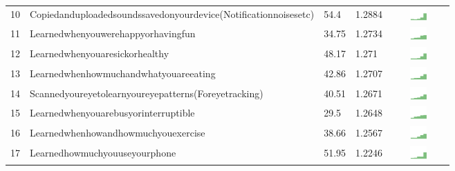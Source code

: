 \documentclass[a4paper,12pt]{article}
\begin{document}
\begin{longtable}{| p{0.5cm} | p{7cm} | p{1cm} |p{1cm} | c |}
10 & Copiedanduploadedsoundssavedonyourdevice(Notificationnoisesetc) & 54.4 & 1.2884&\includegraphics[width = 2cm, height = 0.5cm]{tables/copiedanduploadedsoundssavedonyourdevice(notificationnoisesetc)combined} \\ 
11 & Learnedwhenyouwerehappyorhavingfun & 34.75 & 1.2734&\includegraphics[width = 2cm, height = 0.5cm]{tables/learnedwhenyouwerehappyorhavingfuncombined} \\ 
12 & Learnedwhenyouaresickorhealthy & 48.17 & 1.271&\includegraphics[width = 2cm, height = 0.5cm]{tables/learnedwhenyouaresickorhealthycombined} \\ 
13 & Learnedwhenhowmuchandwhatyouareeating & 42.86 & 1.2707&\includegraphics[width = 2cm, height = 0.5cm]{tables/learnedwhenhowmuchandwhatyouareeatingcombined} \\ 
14 & Scannedyoureyetolearnyoureyepatterns(Foreyetracking) & 40.51 & 1.2671&\includegraphics[width = 2cm, height = 0.5cm]{tables/scannedyoureyetolearnyoureyepatterns(foreyetracking)combined} \\ 
15 & Learnedwhenyouarebusyorinterruptible & 29.5 & 1.2648&\includegraphics[width = 2cm, height = 0.5cm]{tables/learnedwhenyouarebusyorinterruptiblecombined} \\ 
16 & Learnedwhenhowandhowmuchyouexercise & 38.66 & 1.2567&\includegraphics[width = 2cm, height = 0.5cm]{tables/learnedwhenhowandhowmuchyouexercisecombined} \\ 
17 & Learnedhowmuchyouuseyourphone & 51.95 & 1.2246&\includegraphics[width = 2cm, height = 0.5cm]{tables/learnedhowmuchyouuseyourphonecombined} \\ 

\end{longtable}
\end{document}
